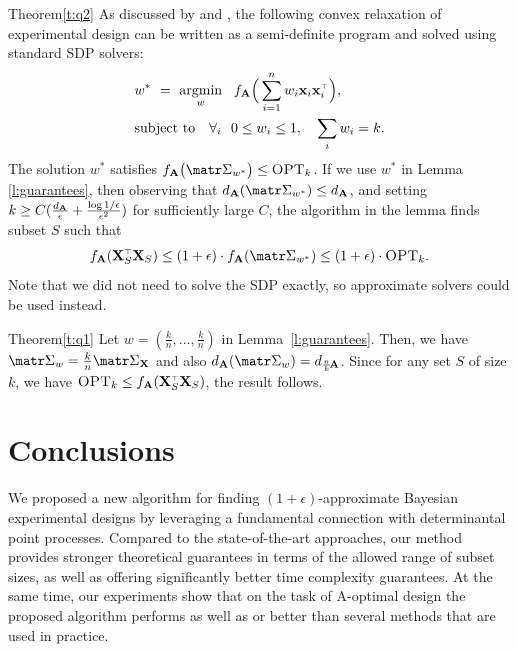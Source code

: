 \documentclass[../../thesis.tex]{subfiles}
\begin{document}
\begin{proofof}{Theorem}{\ref{t:q2}}
  As discussed by \cite{near-optimal-design} and
  \cite{boyd2004convex}, the following convex
  relaxation of experimental design can be written as a semi-definite
  program and solved using standard SDP solvers:
  \begin{align}
     & w^* \ = \  \argmin_w\ \
    f_{\A}\Big(\sum_{i=1}^nw_i\x_i\x_i^\top\Big),\quad \\
     & \text{subject to}\quad
    \forall_i\ \ 0\leq w_i\leq 1,\quad \sum_i w_i=k.\label{eq:sdp}
  \end{align}
  The solution $w^*$ satisfies $f_{\A}\big(\Sigmab_{w^*}\big)\leq
    \opt$. If we use $w^*$ in Lemma \ref{l:guarantees}, then observing
  that $d_{\A}(\Sigmab_{w^*})\leq d_{\A}$, and setting $k\geq C(\frac
    {d_{\mathbf A}}{\epsilon} + \frac{\log1/\epsilon}{\epsilon^2})$ for
  sufficiently large $C$, the algorithm in the lemma finds subset $S$
  such that
  \[f_{\A}(\X_S^\top\X_S)\leq (1+\epsilon)\cdot
    f_{\A}(\Sigmab_{w^*})\leq
    (1+\epsilon)\cdot\opt.\]
  Note that we did not need to
  solve the SDP exactly, so approximate solvers could be used instead.
\end{proofof}
\begin{proofof}{Theorem}{\ref{t:q1}}
  Let $w=(\frac kn,...,\frac kn)$ in Lemma~\ref{l:guarantees}. Then, we have
  $\Sigmab_w=\frac kn\Sigmab_{\X}$ and also $d_{\A}(\Sigmab_w) =
    d_{\frac nk\!\A}$. Since for any set $S$ of size $k$, we
  have $\opt\leq f_{\A}(\X_S^\top\X_S)$, the result follows.
\end{proofof}




\section{Conclusions}

We proposed a new algorithm for finding
$(1+\epsilon)$-approximate Bayesian experimental designs by leveraging
a fundamental connection with determinantal point processes. Compared
to the state-of-the-art approaches, our
method provides stronger theoretical guarantees in terms of the allowed
range of subset sizes, as well as
offering significantly better time complexity guarantees. At the same
time, our experiments show that on the task of A-optimal design the
proposed algorithm performs as well as or better than several methods that
are used in practice.
\end{document}
